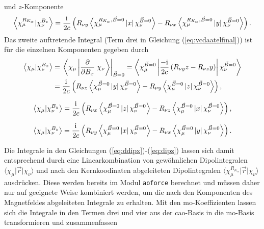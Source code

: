 	und $z$-Komponente	
	\begin{equation} \label{eq:ddipz}
	\left\langle\chi_\mu^{R_{K_\alpha}}\vert\chi_\nu^{B_z}\right\rangle=\frac{\mathrm{i}\mkern1mu}{2c}\left(R_{\nu y}\left\langle\chi_\mu^{R_{K_\alpha},\vec{B}=0}\left|x\right|\chi_\nu^{\vec{B}=0}\right\rangle-R_{\nu x}\left\langle\chi_\mu^{R_{K_\alpha},\vec{B}=0}\left|y\right|\chi_\nu^{\vec{B}=0}\right\rangle\right).
	\end{equation}
	Das zweite auftretende Integral (Term drei in Gleichung (\ref{eq:vcdaatelfinal})) ist für die einzelnen Komponenten gegeben durch	
	\begin{equation} \label{eq:dipx}
	\begin{aligned}
	  \left\langle\chi_\mu\vert\chi_\nu^{B_x}\right\rangle&=\left.\left\langle\chi_\mu\left|\frac{\partial}{\partial B_x}\right.\chi_\nu\right\rangle\right|_{\vec{B}=0}=\left\langle\chi_\mu^{\vec{B}=0}\left|\frac{-\mathrm{i}\mkern1mu}{2c}\left(R_{\nu y}z-R_{\nu z}y\right)\right|\chi_\nu^{\vec{B}=0}\right\rangle\\
	  &=\frac{\mathrm{i}\mkern1mu}{2c}\left(R_{\nu z}\left\langle\chi_\mu^{\vec{B}=0}\left|y\right|\chi_\nu^{\vec{B}=0}\right\rangle-R_{\nu y}\left\langle\chi_\mu^{\vec{B}=0}\left|z\right|\chi_\nu^{\vec{B}=0}\right\rangle\right),
	\end{aligned}
	\end{equation}
 
		\begin{equation} \label{eq:dipy}
	  \left\langle\chi_\mu\vert\chi_\nu^{B_y}\right\rangle=\frac{\mathrm{i}\mkern1mu}{2c}\left(R_{\nu x}\left\langle\chi_\mu^{\vec{B}=0}\left|z\right|\chi_\nu^{\vec{B}=0}\right\rangle-R_{\nu z}\left\langle\chi_\mu^{\vec{B}=0}\left|x\right|\chi_\nu^{\vec{B}=0}\right\rangle\right),
	\end{equation}
	
		\begin{equation} \label{eq:dipz}
	  \left\langle\chi_\mu\vert\chi_\nu^{B_z}\right\rangle=\frac{\mathrm{i}\mkern1mu}{2c}\left(R_{\nu y}\left\langle\chi_\mu^{\vec{B}=0}\left|x\right|\chi_\nu^{\vec{B}=0}\right\rangle-R_{\nu x}\left\langle\chi_\mu^{\vec{B}=0}\left|y\right|\chi_\nu^{\vec{B}=0}\right\rangle\right).
	\end{equation}

	

	Die Integrale in den Gleichungen (\ref{eq:ddipx})-(\ref{eq:dipz}) lassen sich damit entsprechend durch eine Linearkombination von gewöhnlichen Dipolintegralen $\langle\chi_\mu\vert\vec{r}\vert\chi_\nu\rangle$ und nach den Kernkoodinaten abgeleiteten Dipolintegralen $\langle\chi_\mu^{R_{K_\alpha}}\vert\vec{r}\vert\chi_\nu\rangle$ ausdrücken. Diese werden bereits im Modul \texttt{aoforce} berechnet und müssen daher nur auf geeignete Weise kombiniert werden, um die nach den Komponenten des Magnetfeldes abgeleiteten Integrale zu erhalten. Mit den \ac{mo}-Koeffizienten lassen sich die Integrale in den Termen drei und vier aus der \ac{cao}-Basis in die \ac{mo}-Basis transformieren und zusammenfassen\supercite{nicu2008vibrational}
	
